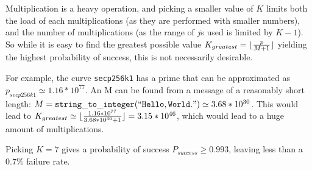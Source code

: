 Multiplication is a heavy operation, and picking a smaller value of \(K\) limits both the load of each multiplications (as they are performed with
smaller numbers), and the number of multiplications (as the range of \(j\)s used is limited by \(K - 1\)). So while it is easy to find the greatest
possible value \(K_{greatest} = {\lfloor { p \over {M + 1} }\rfloor}\) yielding the highest probability of success, this is not necessarily desirable.

For example, the curve \verb+secp256k1+ has a prime that can be approximated as \(p_{secp256k1} \simeq 1.16*10^{77}\).\cite{safecurves} An M can be
found from a message of a reasonably short length: \(M = \mathtt{string\_to\_integer(``Hello, World.")} \simeq 3.68*10^{30}\). This would lead to
\(K_{greatest} \simeq {\lfloor { {1.16*10^{77}} \over {3.68*10^{30} + 1}} \rfloor} = 3.15*10^{46}\), which would lead to a huge amount of multiplications.

Picking \(K = 7\) gives a probability of success \(P_{success} \geq 0.993\), leaving less than a \(0.7\%\) failure rate.